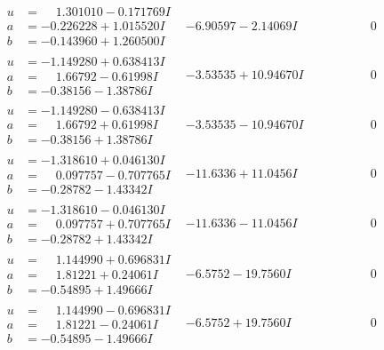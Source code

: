 \documentclass[1p]{elsarticle_modified}
\theoremstyle{definition}
\begin{document}
$$\begin{array}{c|c|c}
\begin{aligned}
u &= \phantom{-}1.301010 - 0.171769 I \\
a &= -0.226228 + 1.015520 I \\
b &= -0.143960 + 1.260500 I\end{aligned}
 & -6.90597 - 2.14069 I & \phantom{-0.000000 } 0 \\ \hline\begin{aligned}
u &= -1.149280 + 0.638413 I \\
a &= \phantom{-}1.66792 - 0.61998 I \\
b &= -0.38156 - 1.38786 I\end{aligned}
 & -3.53535 + 10.94670 I & \phantom{-0.000000 } 0 \\ \hline\begin{aligned}
u &= -1.149280 - 0.638413 I \\
a &= \phantom{-}1.66792 + 0.61998 I \\
b &= -0.38156 + 1.38786 I\end{aligned}
 & -3.53535 - 10.94670 I & \phantom{-0.000000 } 0 \\ \hline\begin{aligned}
u &= -1.318610 + 0.046130 I \\
a &= \phantom{-}0.097757 - 0.707765 I \\
b &= -0.28782 - 1.43342 I\end{aligned}
 & -11.6336 + 11.0456 I & \phantom{-0.000000 } 0 \\ \hline\begin{aligned}
u &= -1.318610 - 0.046130 I \\
a &= \phantom{-}0.097757 + 0.707765 I \\
b &= -0.28782 + 1.43342 I\end{aligned}
 & -11.6336 - 11.0456 I & \phantom{-0.000000 } 0 \\ \hline\begin{aligned}
u &= \phantom{-}1.144990 + 0.696831 I \\
a &= \phantom{-}1.81221 + 0.24061 I \\
b &= -0.54895 + 1.49666 I\end{aligned}
 & -6.5752 - 19.7560 I & \phantom{-0.000000 } 0 \\ \hline\begin{aligned}
u &= \phantom{-}1.144990 - 0.696831 I \\
a &= \phantom{-}1.81221 - 0.24061 I \\
b &= -0.54895 - 1.49666 I\end{aligned}
 & -6.5752 + 19.7560 I & \phantom{-0.000000 } 0 \\ \hline\begin{aligned}

\end{aligned}
\end{array}$$
\end{document}

